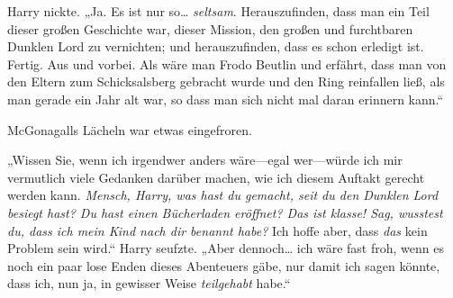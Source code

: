 Harry nickte. „Ja. Es ist nur so… \emph{seltsam}. Herauszufinden, dass man ein Teil dieser großen Geschichte war, dieser Mission, den großen und furchtbaren Dunklen Lord zu vernichten; und herauszufinden, dass es schon erledigt ist. Fertig. Aus und vorbei. Als wäre man Frodo Beutlin und erfährt, dass man von den Eltern zum Schicksalsberg gebracht wurde und den Ring reinfallen ließ, als man gerade ein Jahr alt war, so dass man sich nicht mal daran erinnern kann.“

McGonagalls Lächeln war etwas eingefroren.

„Wissen Sie, wenn ich irgendwer anders wäre—egal wer—würde ich mir vermutlich viele Gedanken darüber machen, wie ich diesem Auftakt gerecht werden kann. \emph{Mensch, Harry, was hast du gemacht, seit du den Dunklen Lord besiegt hast? Du hast einen Bücherladen eröffnet? Das ist klasse! Sag, wusstest du, dass ich mein Kind nach dir benannt habe?} Ich hoffe aber, dass \emph{das} kein Problem sein wird.“ Harry seufzte. „Aber dennoch… ich wäre fast froh, wenn es noch ein paar lose Enden dieses Abenteuers gäbe, nur damit ich sagen könnte, dass ich, nun ja, in gewisser Weise \emph{teilgehabt} habe.“

